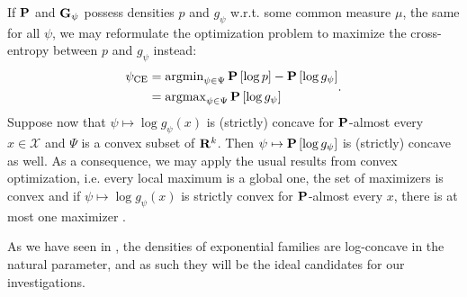 If $\P$ and $\G_{\psi}$ possess densities $p$ and $g_{\psi}$ w.r.t. some common measure $\mu$, the same for all $\psi$, we may reformulate the optimization problem to maximize the cross-entropy between $p$ and $g_{\psi}$ instead:
\begin{align}
    \begin{split}
    \psi_{\text{CE}} &= \argmin_{\psi \in \Psi} \P \left[\log p \right] - \P \left[\log g_{\psi}\right] \\
    &= \argmax_{\psi \in \Psi} \P \left[\log g_{\psi}\right]
    \end{split} \label{eq:ce_argmax}.
\end{align}
Suppose now that $\psi \mapsto \log g_{\psi}(x)$ is (strictly) concave for $\P$-almost every $x \in \mathcal X$ and $\Psi$ is a convex subset of $\R^{k}$. Then $\psi \mapsto \P \left[\log g_{\psi}\right]$ is (strictly) concave as well. As a consequence, we may apply the usual results from convex optimization, i.e. every local maximum is a global one, the set of maximizers is convex and if $\psi \mapsto \log g_{\psi}(x)$ is strictly convex for $\P$-almost every $x$, there is at most one maximizer .

As we have seen in , the densities of exponential families are log-concave in the natural parameter, and as such they will be the ideal candidates for our investigations. 

%
%
%    

